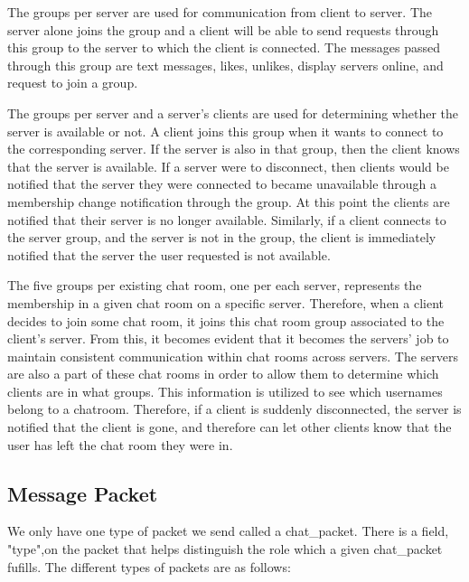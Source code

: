\documentclass[12pt,journal,compsoc]{IEEEtran}
\begin{document}
The groups per server are used for communication from client to server. The server alone joins the group and a client will be able to send requests through this group to the server to which the client is connected.  The messages passed through this group are text messages, likes, unlikes, display servers online, and request to join a group.

The groups per server and a server's clients are used for determining whether the server is available or not. A client joins this group when it wants to connect to the corresponding server. If the server is also in that group, then the client knows that the server is available. If a server were to disconnect, then clients would be notified that the server they were connected to became unavailable through a membership change notification through the group.  At this point the clients are notified that their server is no longer available.  Similarly, if a client connects to the server group, and the server is not in the group, the client is immediately notified that the server the user requested is not available.

The five groups per existing chat room, one per each server, represents the membership in a given chat room on a specific server. Therefore, when a client decides to join some chat room, it joins this chat room group associated to the client's server. From this, it becomes evident that it becomes the servers' job to maintain consistent communication within chat rooms across servers. The servers are also a part of these chat rooms in order to allow them to determine which clients are in what groups.  This information is utilized to see which usernames belong to a chatroom.  Therefore, if a client is suddenly disconnected, the server is notified that the client is gone, and therefore can let other clients know that the user has left the chat room they were in.

\subsection{Message Packet}

We only have one type of packet we send called a chat\_packet. There is a field, "type",on the packet that helps distinguish the role which a given chat\_packet fufills. The different types of packets are as follows:
\end{document}
